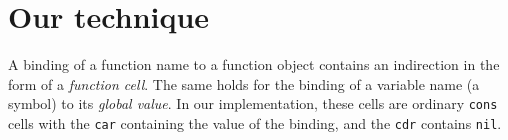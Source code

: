 \section{Our technique}

A binding of a function name to a function object contains an
indirection in the form of a \emph{function cell}.  The same holds for
the binding of a variable name (a symbol) to its \emph{global value}.
In our implementation, these cells are ordinary \texttt{cons} cells
with the \texttt{car} containing the value of the binding, and the
\texttt{cdr} contains \texttt{nil}.
